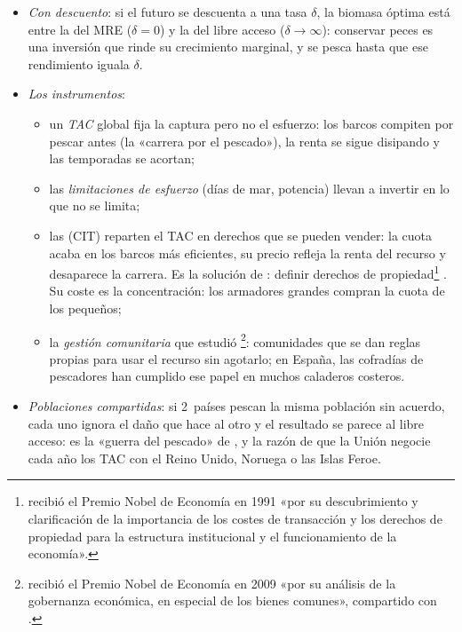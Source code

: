 \documentclass[11pt]{article}
\begin{document}
\begin{itemize}
\item \emph{Con descuento}: si el futuro se descuenta a una tasa $\delta$, la biomasa óptima está entre la del MRE ($\delta=0$) y la del libre acceso ($\delta\to\infty$): conservar peces es una inversión que rinde su crecimiento marginal, y se pesca hasta que ese rendimiento iguala $\delta$\nocite{Clark1990}.
\item \emph{Los instrumentos}:
  \begin{itemize}
  \item un \emph{TAC} global fija la captura pero no el esfuerzo: los barcos compiten por pescar antes (la «carrera por el pescado»), la renta se sigue disipando y las temporadas se acortan;
  \item las \emph{limitaciones de esfuerzo} (días de mar, potencia) llevan a invertir en lo que no se limita;
  \item las  (CIT) reparten el TAC en derechos que se pueden vender: la cuota acaba en los barcos más eficientes, su precio refleja la renta del recurso y desaparece la carrera. Es la solución de : definir derechos de propiedad\footnote{ recibió el Premio Nobel de Economía en 1991 «por su descubrimiento y clarificación de la importancia de los costes de transacción y los derechos de propiedad para la estructura institucional y el funcionamiento de la economía»\nocite{Nobel1991Coase}.} . Su coste es la concentración: los armadores grandes compran la cuota de los pequeños;
  \item la \emph{gestión comunitaria} que estudió \footnote{ recibió el Premio Nobel de Economía en 2009 «por su análisis de la gobernanza económica, en especial de los bienes comunes», compartido con \nocite{Nobel2009OstromWilliamson}.}: comunidades que se dan reglas propias para usar el recurso sin agotarlo\nocite{Ostrom1990Governing}; en España, las cofradías de pescadores han cumplido ese papel en muchos caladeros costeros.
  \end{itemize}
\item \emph{Poblaciones compartidas}: si 2~países pescan la misma población sin acuerdo, cada uno ignora el daño que hace al otro y el resultado se parece al libre acceso: es la «guerra del pescado» de \textcite{LevhariMirman1980}, y la razón de que la Unión negocie cada año los TAC con el Reino Unido, Noruega o las Islas Feroe\nocite{Munro1979}.
\end{itemize}
\end{document}
